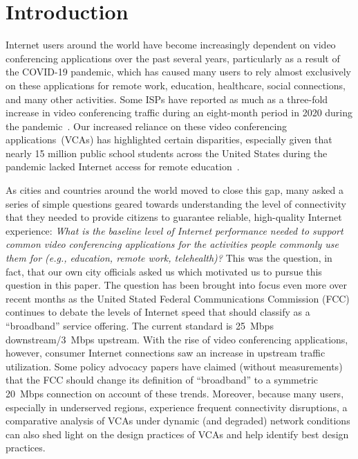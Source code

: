 \section{Introduction}\label{sec:intro}

Internet users around the world have become increasingly dependent on video
conferencing applications over the past several years, particularly as a
result of the COVID-19 pandemic, which has caused many users to rely almost
exclusively on these applications for remote work, education, healthcare,
social connections, and many other activities.  Some ISPs have reported as
much as a three-fold increase in video conferencing traffic during an
eight-month period in 2020 during the pandemic~\cite{bitag_report}. Our
increased reliance on these video conferencing applications~(VCAs) has highlighted
certain disparities, especially given that nearly 15 million
public school students across the United States during the pandemic lacked
Internet access for remote education~\cite{common_sense_report}. 

As cities and countries around the world moved to close this gap, many asked a
series of simple questions geared towards understanding the level of
connectivity that they needed to provide citizens to guarantee reliable,
high-quality Internet experience: {\em What is the baseline level of Internet
performance needed to support common video conferencing applications for the
activities people commonly use them for (e.g., education, remote work,
telehealth)?} This was the question, in fact, that our own city officials
asked us which motivated us to pursue this question in this paper. The question
has been brought into focus even more over recent months as the United Stated
Federal Communications Commission (FCC) continues to debate the levels of
Internet speed that should classify as a ``broadband'' service offering. The
current standard is 25~Mbps downstream/3~Mbps upstream. With the rise of video
conferencing applications, however, consumer Internet connections saw an
increase in upstream traffic utilization. Some policy advocacy papers have
claimed (without measurements) that the FCC should change its definition
of ``broadband'' to a symmetric 20~Mbps connection on account of these trends.
Moreover, because many users, especially in underserved regions, experience
frequent connectivity disruptions, a comparative analysis of VCAs under
dynamic (and degraded) network conditions can also shed light on the design
practices of VCAs and help identify best design practices.

